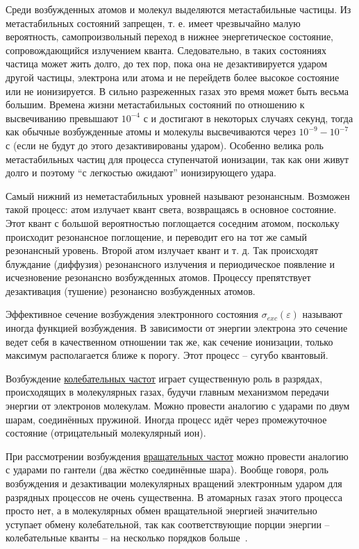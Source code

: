 \documentclass[10pt, a4paper]{article}
\begin{document}
Среди возбужденных атомов и молекул выделяются метастабильные частицы. Из метастабильных состояний запрещен, т. е. имеет чрезвычайно малую вероятность, самопроизвольный переход в нижнее энергетическое состояние, сопровождающийся излучением кванта. Следовательно, в таких состояниях частица может жить долго, до тех пор, пока она не дезактивируется ударом другой частицы, электрона или атома и не перейдетв более высокое состояние или не ионизируется. В сильно разреженных газах это время может быть весьма большим. Времена жизни метастабильных состояний по отношению к высвечиванию превышают $10^{-4}$ с и достигают в некоторых случаях секунд, тогда как обычные возбужденные атомы и молекулы высвечиваются через $10^{-9}-10^{-7}$ с (если не будут до этого дезактивированы ударом). Особенно велика роль метастабильных частиц для процесса ступенчатой ионизации, так как они живут долго и поэтому ``с легкостью ожидают'' ионизирующего удара.

Самый нижний из неметастабильных уровней называют резонансным. Возможен такой процесс: атом излучает квант света, возвращаясь в основное состояние. Этот квант с большой вероятностью поглощается соседним атомом, поскольку происходит резонансное поглощение, и переводит его на тот же самый резонансный уровень. Второй атом излучает квант и т. д. Так происходят блуждание (диффузия) резонансного излучения и периодическое появление и исчезновение резонансно возбужденных атомов. Процессу препятствует дезактивация (тушение) резонансно возбужденных атомов.

Эффективное сечение возбуждения электронного состояния $\sigma_{exc}(\varepsilon)$ называют иногда функцией возбуждения. В зависимости от энергии электрона это сечение ведет себя в качественном отношении так же, как сечение ионизации, только максимум располагается ближе к порогу. Этот процесс -- сугубо квантовый.

Возбуждение \uline{колебательных частот} играет существенную роль в разрядах, происходящих в молекулярных газах, будучи главным механизмом передачи энергии от электронов молекулам. Можно провести аналогию с ударами по двум шарам, соединённых пружиной. Иногда процесс идёт через промежуточное состояние (отрицательный молекулярный ион).

При рассмотрении возбуждения \uline{вращательных частот} можно провести аналогию с ударами по гантели (два жёстко соединённые шара). Вообще говоря, роль возбуждения и дезактивации молекулярных вращений электронным ударом для разрядных процессов не очень существенна. В атомарных газах этого процесса просто нет, а в молекулярных обмен вращательной энергией значительно уступает обмену колебательной, так как соответствующие порции энергии -- колебательные кванты -- на несколько порядков больше~\cite{raizer}.
\end{document}
